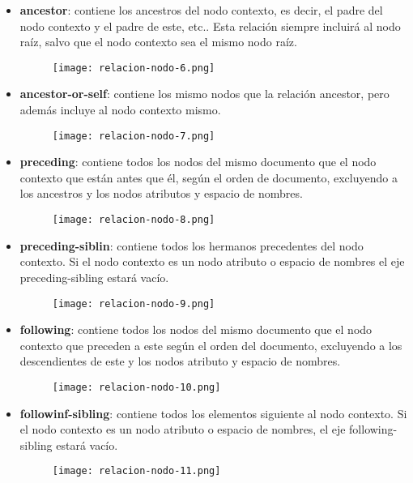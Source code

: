 \begin{itemize}
    \item \textbf{ancestor}: contiene los ancestros del nodo contexto, es decir, el padre del nodo contexto y el padre de este, etc.. Esta relación siempre incluirá al nodo raíz, salvo que el nodo contexto sea el mismo nodo raíz.
    \begin{figure}[H]
        \centering
        \texttt{[image: relacion-nodo-6.png]}
    \end{figure}

    \item \textbf{ancestor-or-self}: contiene los mismo nodos que la relación ancestor, pero además incluye al nodo contexto mismo.
    \begin{figure}[H]
        \centering
        \texttt{[image: relacion-nodo-7.png]}
    \end{figure}

    \item \textbf{preceding}: contiene todos los nodos del mismo documento que el nodo contexto que están antes que él, según el orden de documento, excluyendo a los ancestros y los nodos atributos y espacio de nombres.
    \begin{figure}[H]
        \centering
        \texttt{[image: relacion-nodo-8.png]}
    \end{figure}

    \item \textbf{preceding-siblin}: contiene todos los hermanos precedentes del nodo contexto. Si el nodo contexto es un nodo atributo o espacio de nombres el eje preceding-sibling estará vacío.
    \begin{figure}[H]
        \centering
        \texttt{[image: relacion-nodo-9.png]}
    \end{figure}

    \item \textbf{following}: contiene todos los nodos del mismo documento que el nodo contexto que preceden a este según el orden del documento, excluyendo a los descendientes de este y los nodos atributo y espacio de nombres.
    \begin{figure}[H]
        \centering
        \texttt{[image: relacion-nodo-10.png]}
    \end{figure}

    \item \textbf{followinf-sibling}: contiene todos los elementos siguiente al nodo contexto. Si el nodo contexto es un nodo atributo o espacio de nombres, el eje following-sibling estará vacío.
    \begin{figure}[H]
        \centering
        \texttt{[image: relacion-nodo-11.png]}
    \end{figure}
\end{itemize}

